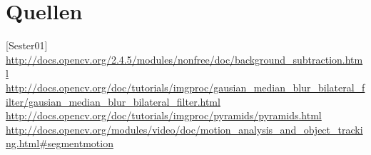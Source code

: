 \chapter{Quellen}
[Sester01]
\url{http://docs.opencv.org/2.4.5/modules/nonfree/doc/background_subtraction.html}
\url{http://docs.opencv.org/doc/tutorials/imgproc/gausian_median_blur_bilateral_filter/gausian_median_blur_bilateral_filter.html}
\url{http://docs.opencv.org/doc/tutorials/imgproc/pyramids/pyramids.html}
\url{http://docs.opencv.org/modules/video/doc/motion_analysis_and_object_tracking.html#segmentmotion}